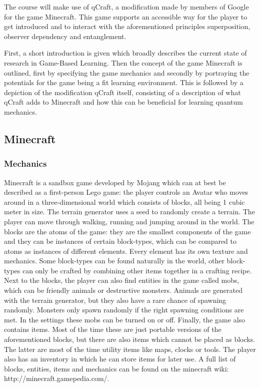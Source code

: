 \documentclass[12pt]{report} %
\begin{document}
The course will make use of qCraft, a modification made by members of Google for the game Minecraft. This game supports an accessible way for the player to get introduced and to interact with the aforementioned principles superposition, observer dependency and entanglement.

First, a short introduction is given which broadly describes the current state of research in Game-Based Learning. Then the concept of the game Minecraft is outlined, first by specifying the game mechanics and secondly by portraying the potentials for the game being a fit learning environment. This is followed by a depiction of the modification qCraft itself, consisting of a description of what qCraft adds to Minecraft and how this can be beneficial for learning quantum mechanics. 

\subsection{Minecraft}

\subsubsection{Mechanics}

Minecraft is a sandbox game developed by Mojang which can at best be described as a first-person Lego game: the player controls an Avatar who moves around in a three-dimensional world which consists of blocks, all being 1 cubic meter in size. The terrain generator uses a seed to randomly create a terrain. The player can move through walking, running and jumping around in the world. The blocks are the atoms of the game: they are the smallest components of the game and they can be instances of certain block-types, which can be compared to atoms as instances of different elements. Every element has its own texture and mechanics. Some block-types can be found naturally in the world, other block-types can only be crafted by combining other items together in a crafting recipe. Next to the blocks, the player can also find entities in the game called mobs, which can be friendly animals or destructive monsters. Animals are generated with the terrain generator, but they also have a rare chance of spawning randomly. Monsters only spawn randomly if the right spawning conditions are met. In the settings these mobs can be turned on or off. Finally, the game also contains items. Most of the time these are just portable versions of the aforementioned blocks, but there are also items which cannot be placed as blocks. The latter are most of the time utility items like maps, clocks or tools. The player also has an inventory in which he can store items for later use. A full list of blocks, entities, items and mechanics can be found on the minecraft wiki: http://minecraft.gamepedia.com/.
\end{document}
